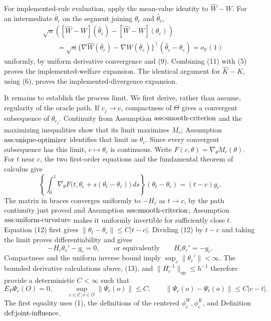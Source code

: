 For implemented-rule evaluation, apply the mean-value identity to \(\widehat W-W\).  For an intermediate \(\bar\theta_c\) on the segment joining \(\theta_c\) and \(\widehat\theta_c\),
\[
\begin{aligned}
 &\sqrt n\left(
 [\widehat W-W](\widehat\theta_c)-[\widehat W-W](\theta_c)
 \right)\\
 &\qquad=\sqrt n\{\nabla\widehat W(\bar\theta_c)-\nabla W(\bar\theta_c)\}^\top
 (\widehat\theta_c-\theta_c)=o_{\mathbb P}(1)
\end{aligned} \tag{11}
\]
uniformly, by uniform derivative convergence and (9).  Combining (11) with (5) proves the implemented-welfare expansion.  The identical argument for \(\widehat K-K\), using (6), proves the implemented-divergence expansion.

It remains to establish the process limit.  We first derive, rather than assume, regularity of the oracle path.  If \(c_j\to c\), compactness of \(\Theta\) gives a convergent subsequence of \(\theta_{c_j}\).  Continuity from Assumption \(\textnormal{ass:smooth-criterion}\) and the maximizing inequalities show that its limit maximizes \(M_c\); Assumption \(\textnormal{ass:unique-optimizer}\) identifies that limit as \(\theta_c\).  Since every convergent subsequence has this limit, \(c\mapsto\theta_c\) is continuous.  Write \(F(c,\theta)=\nabla_\theta M_c(\theta)\).  For \(t\) near \(c\), the two first-order equations and the fundamental theorem of calculus give
\[
 \left\{\int_0^1\nabla_\theta F\bigl(t,\theta_c+s(\theta_t-\theta_c)\bigr)\,ds\right\}
 (\theta_t-\theta_c)=(t-c)g_c. \tag{12}
\]
The matrix in braces converges uniformly to \(-H_c\) as \(t\to c\), by the path continuity just proved and Assumption \(\textnormal{ass:smooth-criterion}\); Assumption \(\textnormal{ass:uniform-curvature}\) makes it uniformly invertible for sufficiently close \(t\).  Equation (12) first gives \(\|\theta_t-\theta_c\|\le C|t-c|\).  Dividing (12) by \(t-c\) and taking the limit proves differentiability and gives
\[
 -H_c\theta_c'-g_c=0,
 \qquad\text{or equivalently}\qquad H_c\theta_c'=-g_c. \tag{13}
\]
Compactness and the uniform inverse bound imply \(\sup_c\|\theta_c'\|<\infty\).  The bounded derivative calculations above, (13), and \(\|H_c^{-1}\|_{\mathrm{op}}\le h^{-1}\) therefore provide a deterministic \(C<\infty\) such that
\[
 E_P\Psi_c(O)=0,
 \qquad \sup_{c\in\mathcal C,o\in\mathcal O}\|\Psi_c(o)\|\le C,
 \qquad \|\Psi_c(o)-\Psi_t(o)\|\le C|c-t|. \tag{14}
\]
The first equality uses (1), the definitions of the centered \(\phi_c^W,\phi_c^K\), and Definition \(\textnormal{def:joint-influence}\).

